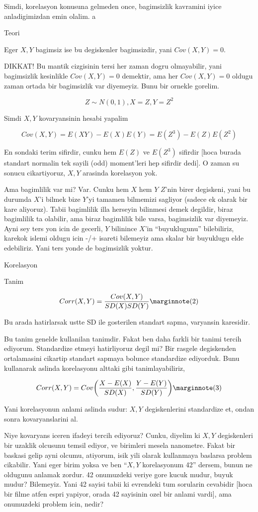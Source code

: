 \documentclass[12pt,fleqn]{article}\usepackage{../common}
\begin{document}
Simdi, korelasyon konusuna gelmeden once, bagimsizlik kavramini iyice
anladigimizdan emin olalim. a 

Teori

Eger $X,Y$ bagimsiz ise bu degiskenler bagimsizdir, yani $Cov(X,Y)=0$.

DIKKAT! Bu mantik cizgisinin tersi her zaman dogru olmayabilir, yani
bagimsizlik kesinlikle $Cov(X,Y)=0$ demektir, ama her $Cov(X,Y)=0$ oldugu
zaman ortada bir bagimsizlik var diyemeyiz. Bunu bir ornekle gorelim. 

$$ Z \sim N(0,1), X=Z, Y=Z^2 $$

Simdi $X,Y$ kovaryansinin hesabi yapalim

$$ Cov(X,Y) = E(XY) - E(X)E(Y) = E(Z^3) - E(Z)E(Z^2)$$

En sondaki terim sifirdir, cunku hem $E(Z)$ ve $E(Z^3)$ sifirdir [hoca
burada standart normalin tek sayili (odd) moment'leri hep sifirdir dedi]. O
zaman su sonucu cikartiyoruz, $X,Y$ arasinda korelasyon yok. 

Ama bagimlilik var mi? Var. Cunku hem $X$ hem $Y$ $Z$'nin birer degiskeni,
yani bu durumda $X$'i bilmek bize $Y$'yi tamamen bilmemizi sagliyor (sadece
ek olarak bir kare aliyoruz). Tabii bagimlilik illa herseyin bilinmesi
demek degildir, biraz bagimlilik ta olabilir, ama biraz bagimlilik bile
varsa, bagimsizlik var diyemeyiz. Ayni sey ters yon icin de gecerli, $Y$
bilinince $X$'in ``buyuklugunu'' bilebiliriz, karekok islemi oldugu icin
-/+ isareti bilemeyiz ama skalar bir buyuklugu elde edebiliriz. Yani ters
yonde de bagimsizlik yoktur. 

Korelasyon

Tanim

$$ Corr(X,Y) = \frac{Cov(X,Y)}{SD(X)SD(Y)} 
\mlabel{2}
$$

Bu arada hatirlarsak ustte SD ile gosterilen standart sapma, varyansin
karesidir. 

Bu tanim genelde kullanilan tanimdir. Fakat ben daha farkli bir tanimi
tercih ediyorum. Standardize etmeyi hatirliyoruz degil mi? Bir rasgele
degiskenden ortalamasini cikartip standart sapmaya bolunce standardize
ediyorduk. Bunu kullanarak aslinda korelasyonu alttaki gibi
tanimlayabiliriz, 

$$ Corr(X,Y) = Cov \bigg( \frac{X-E(X)}{SD(X)}, \frac{Y-E(Y)}{SD(Y)}
\bigg) 
\mlabel{3}
$$

Yani korelasyonun anlami aslinda sudur: $X,Y$ degiskenlerini standardize
et, ondan sonra kovaryanslarini al. 

Niye kovaryans iceren ifadeyi tercih ediyoruz? Cunku, diyelim ki $X,Y$
degiskenleri bir uzaklik olcusunu temsil ediyor, ve birimleri mesela
nanometre. Fakat bir baskasi gelip ayni olcumu, atiyorum, isik yili olarak
kullanmaya baslarsa problem cikabilir. Yani eger birim yoksa ve ben ``$X,Y$
korelasyonum 42'' dersem, bunun ne oldugunu anlamak zordur. 42 onumuzdeki
veriye gore kucuk mudur, buyuk mudur? Bilemeyiz. Yani 42 sayisi tabii ki
evrendeki tum sorularin cevabidir [hoca bir filme atfen espri yapiyor,
orada 42 sayisinin ozel bir anlami vardi], ama onumuzdeki problem icin,
nedir? 
\end{document}
